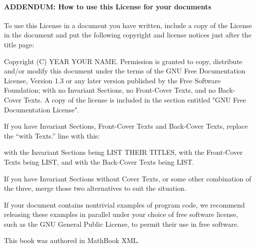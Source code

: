 \documentclass[10pt,]{book}
\theoremstyle{ptxplainnotitle}
\theoremstyle{ptxplaintitle}
\theoremstyle{ptxplainnotitle}
\theoremstyle{ptxplaintitle}
\theoremstyle{ptxplainnotitle}
\theoremstyle{ptxplaintitle}
\theoremstyle{ptxdefinitionnotitle}
\theoremstyle{ptxdefinitiontitle}
\theoremstyle{ptxdefinitionnotitle}
\theoremstyle{ptxdefinitiontitle}
\theoremstyle{ptxdefinitionnotitle}
\theoremstyle{ptxdefinitiontitle}
\theoremstyle{ptxdefinitionnotitle}
\theoremstyle{ptxdefinitiontitle}
\theoremstyle{ptxdefinitionnotitle}
\theoremstyle{ptxdefinitiontitle}
\numberwithin{equation}{section}
\begin{document}
\paragraph[{ADDENDUM: How to use this License for your documents}]{ADDENDUM: How to use this License for your documents}\hypertarget{gfdl-addendum}{}
\hypertarget{p-1243}{}%
To use this License in a document you have written, include a copy of the License in the document and put the following copyright and license notices just after the title page:%
\begin{preformatted}
Copyright (C)  YEAR  YOUR NAME.
Permission is granted to copy, distribute and/or modify this document
under the terms of the GNU Free Documentation License, Version 1.3
or any later version published by the Free Software Foundation;
with no Invariant Sections, no Front-Cover Texts, and no Back-Cover Texts.
A copy of the license is included in the section entitled "GNU
Free Documentation License".
\end{preformatted}
\hypertarget{p-1244}{}%
If you have Invariant Sections, Front-Cover Texts and Back-Cover Texts, replace the ``with\textellipsis{} Texts.'' line with this:%
\begin{preformatted}
with the Invariant Sections being LIST THEIR TITLES, with the
Front-Cover Texts being LIST, and with the Back-Cover Texts being LIST.
\end{preformatted}
\hypertarget{p-1245}{}%
If you have Invariant Sections without Cover Texts, or some other combination of the three, merge those two alternatives to suit the situation.%
\par
\hypertarget{p-1246}{}%
If your document contains nontrivial examples of program code, we recommend releasing these examples in parallel under your choice of free software license, such as the GNU General Public License, to permit their use in free software.%
%
\backmatter
%
%
\printindex
%
\cleardoublepage
\pagestyle{empty}
\hypertarget{colophon-1}{}
\centerline{\hypertarget{p-1247}{}%
This book was authored in MathBook XML.%
}
\end{document}
